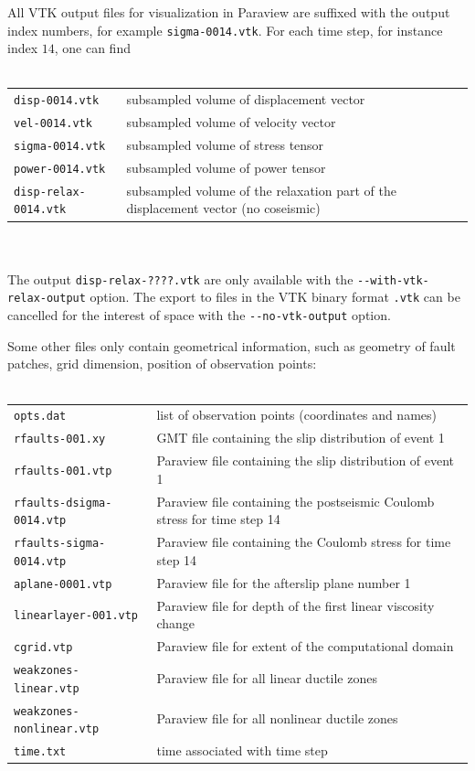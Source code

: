 \documentclass[10pt]{article}
\begin{document}
All VTK output files for visualization in Paraview are suffixed with the output index numbers, for example \verb'sigma-0014.vtk'. For each time step, for instance index $14$, one can find\\
\\
\begin{tabular}{ll}
\verb'disp-0014.vtk' & subsampled volume of displacement vector\\
\verb'vel-0014.vtk' & subsampled volume of velocity vector\\
\verb'sigma-0014.vtk' & subsampled volume of stress tensor\\
\verb'power-0014.vtk' & subsampled volume of power tensor\\
\verb'disp-relax-0014.vtk' & subsampled volume of the relaxation part of the displacement vector (no coseismic)\\
\end{tabular}\\
\\
The output \verb'disp-relax-????.vtk' are only available with the \verb`--with-vtk-relax-output` option. The export to files in the VTK binary format \verb'.vtk' can be cancelled for the interest of space with the \verb'--no-vtk-output' option.

Some other files only contain geometrical information, such as geometry of fault patches, grid dimension, position of observation points:\\
\\
\begin{tabular}{ll}
\verb'opts.dat' & list of observation points (coordinates and names)\\
\verb'rfaults-001.xy' & GMT file containing the slip distribution of event 1\\
\verb'rfaults-001.vtp' & Paraview file containing the slip distribution of event 1\\
\verb'rfaults-dsigma-0014.vtp' & Paraview file containing the postseismic Coulomb stress for time step 14\\
\verb'rfaults-sigma-0014.vtp' & Paraview file containing the Coulomb stress for time step 14\\
\verb'aplane-0001.vtp' & Paraview file for the afterslip plane number 1\\
\verb'linearlayer-001.vtp' & Paraview file for depth of the first linear viscosity change\\
\verb'cgrid.vtp' & Paraview file for extent of the computational domain\\
\verb'weakzones-linear.vtp'  & Paraview file for all linear ductile zones\\
\verb'weakzones-nonlinear.vtp' & Paraview file for all nonlinear ductile zones\\
\verb'time.txt' &  time associated with time step\\
\end{tabular}\\
\end{document}

